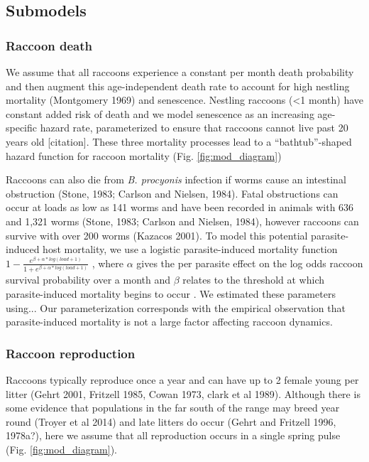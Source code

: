 \documentclass[11pt]{article}
\begin{document}
\subsection{Submodels}

\subsubsection{Raccoon death}

We assume that all raccoons experience a constant per month death
probability and then augment this age-independent death rate to account
for high nestling mortality (Montgomery 1969) and senescence. Nestling
raccoons (\textless{}1 month) have constant added risk of death and we
model senescence as an increasing age-specific hazard rate,
parameterized to ensure that raccoons cannot live past 20 years old [citation].
These three mortality processes lead to a ``bathtub''-shaped hazard
function for raccoon mortality (Fig. \ref{fig:mod_diagram})

Raccoons can also die from \emph{B. procyonis} infection if worms cause
an intestinal obstruction (Stone, 1983; Carlson and Nielsen, 1984).
Fatal obstructions can occur at loads as low as 141 worms and have been
recorded in animals with 636 and 1,321 worms (Stone, 1983; Carlson and
Nielsen, 1984), however raccoons can survive with over 200 worms
(Kazacos 2001). To model this potential parasite-induced host mortality,
we use a logistic parasite-induced mortality function
\(1 - \frac{e^{\beta + \alpha*log(load + 1)}}{1 + e^{\beta + \alpha*log(load + 1)}}\)
, where $\alpha$ gives the per parasite effect on the log
odds raccoon survival probability over a month and $\beta$ relates to the threshold at which parasite-induced mortality begins
to occur \citep{Wilber2016}. We estimated these parameters using... Our parameterization corresponds with the empirical observation that parasite-induced mortality is not a large factor affecting raccoon dynamics.

\subsubsection{Raccoon reproduction}

Raccoons typically reproduce once a year and can have up to 2 female
young per litter (Gehrt 2001, Fritzell 1985, Cowan 1973, clark et al
1989). Although there is some evidence that populations in the far south
of the range may breed year round (Troyer et al 2014) and late litters
do occur (Gehrt and Fritzell 1996, 1978a?), here we assume that all
reproduction occurs in a single spring pulse (Fig. \ref{fig:mod_diagram}).
\end{document}
